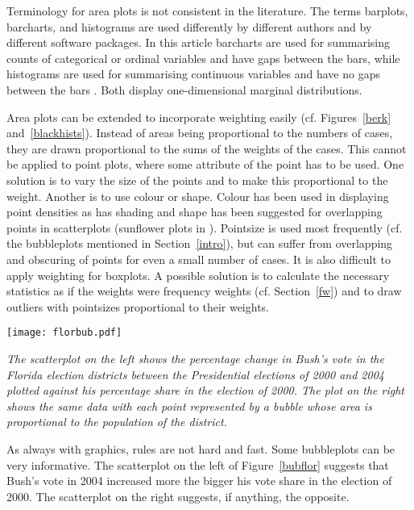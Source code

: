 \documentclass{svmult}
\begin{document}
Terminology for area plots is not consistent in the literature.  The terms barplots, barcharts, and histograms are used differently by different authors and by different software packages.  In this article barcharts are used for summarising counts of categorical or ordinal variables and have gaps between the bars, while histograms are used for summarising continuous variables and have no gaps between the bars \citep{unwin:2006}.  Both display one-dimensional marginal distributions.

Area plots can be extended to incorporate weighting easily (cf. Figures~\ref{berk} and~\ref{blackhists}).  Instead of areas being proportional to the numbers of cases, they are drawn proportional to the sums of the weights of the cases.  This cannot be applied to point plots, where some attribute of the point has to be used.  One solution is to vary the size of the points and to make this proportional to the weight.  Another is to use colour or shape.  Colour has been used in displaying point densities \citep{carr:1987} as has shading \citep{hofmann:2000a} and shape has been suggested for overlapping points in scatterplots (sunflower plots in \cite{cleveland:1984}).  Pointsize is used most frequently (cf. the bubbleplots mentioned in Section~\ref{intro}), but can suffer from overlapping and obscuring of points for even a small number of cases.  It is also difficult to apply weighting for boxplots.  A possible solution is to calculate the necessary statistics as if the weights were frequency weights (cf. Section~\ref{fw}) and to draw outliers with pointsizes proportional to their weights.

\begin{center}
      \texttt{[image: florbub.pdf]}
      \caption{\label{bubflor}\em The scatterplot on the left shows the percentage change in Bush's vote in the Florida election districts between the Presidential elections of 2000 and 2004 plotted against his percentage share in the election of 2000.  The plot on the right shows the same data with each point represented by a bubble whose area is proportional to the population of the district.}
      \end{center}
      
As always with graphics, rules are not hard and fast.  Some bubbleplots can be very informative.  The scatterplot on the left of Figure~\ref{bubflor} suggests that Bush's vote in 2004 increased more the bigger his vote share in the election of 2000.  The scatterplot on the right suggests, if anything, the opposite. 
\end{document}
